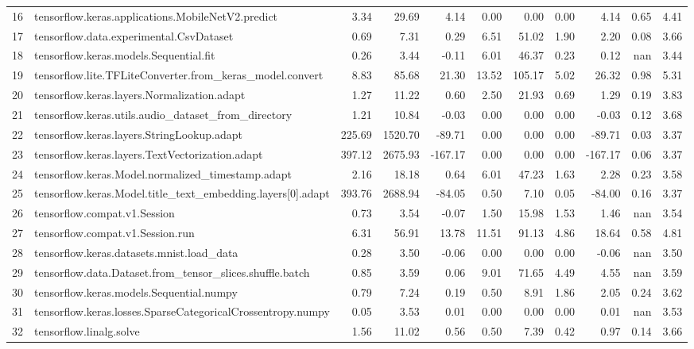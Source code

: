 \begin{tabular}{llrrrrrrrrr}
16 & tensorflow.keras.applications.MobileNetV2.predict & 3.34 & 29.69 & 4.14 & 0.00 & 0.00 & 0.00 & 4.14 & 0.65 & 4.41 \\
17 & tensorflow.data.experimental.CsvDataset & 0.69 & 7.31 & 0.29 & 6.51 & 51.02 & 1.90 & 2.20 & 0.08 & 3.66 \\
18 & tensorflow.keras.models.Sequential.fit & 0.26 & 3.44 & -0.11 & 6.01 & 46.37 & 0.23 & 0.12 & nan & 3.44 \\
19 & tensorflow.lite.TFLiteConverter.from_keras_model.convert & 8.83 & 85.68 & 21.30 & 13.52 & 105.17 & 5.02 & 26.32 & 0.98 & 5.31 \\
20 & tensorflow.keras.layers.Normalization.adapt & 1.27 & 11.22 & 0.60 & 2.50 & 21.93 & 0.69 & 1.29 & 0.19 & 3.83 \\
21 & tensorflow.keras.utils.audio_dataset_from_directory & 1.21 & 10.84 & -0.03 & 0.00 & 0.00 & 0.00 & -0.03 & 0.12 & 3.68 \\
22 & tensorflow.keras.layers.StringLookup.adapt & 225.69 & 1520.70 & -89.71 & 0.00 & 0.00 & 0.00 & -89.71 & 0.03 & 3.37 \\
23 & tensorflow.keras.layers.TextVectorization.adapt & 397.12 & 2675.93 & -167.17 & 0.00 & 0.00 & 0.00 & -167.17 & 0.06 & 3.37 \\
24 & tensorflow.keras.Model.normalized_timestamp.adapt & 2.16 & 18.18 & 0.64 & 6.01 & 47.23 & 1.63 & 2.28 & 0.23 & 3.58 \\
25 & tensorflow.keras.Model.title_text_embedding.layers[0].adapt & 393.76 & 2688.94 & -84.05 & 0.50 & 7.10 & 0.05 & -84.00 & 0.16 & 3.37 \\
26 & tensorflow.compat.v1.Session & 0.73 & 3.54 & -0.07 & 1.50 & 15.98 & 1.53 & 1.46 & nan & 3.54 \\
27 & tensorflow.compat.v1.Session.run & 6.31 & 56.91 & 13.78 & 11.51 & 91.13 & 4.86 & 18.64 & 0.58 & 4.81 \\
28 & tensorflow.keras.datasets.mnist.load_data & 0.28 & 3.50 & -0.06 & 0.00 & 0.00 & 0.00 & -0.06 & nan & 3.50 \\
29 & tensorflow.data.Dataset.from_tensor_slices.shuffle.batch & 0.85 & 3.59 & 0.06 & 9.01 & 71.65 & 4.49 & 4.55 & nan & 3.59 \\
30 & tensorflow.keras.models.Sequential.numpy & 0.79 & 7.24 & 0.19 & 0.50 & 8.91 & 1.86 & 2.05 & 0.24 & 3.62 \\
31 & tensorflow.keras.losses.SparseCategoricalCrossentropy.numpy & 0.05 & 3.53 & 0.01 & 0.00 & 0.00 & 0.00 & 0.01 & nan & 3.53 \\
32 & tensorflow.linalg.solve & 1.56 & 11.02 & 0.56 & 0.50 & 7.39 & 0.42 & 0.97 & 0.14 & 3.66 \\

\end{tabular}
